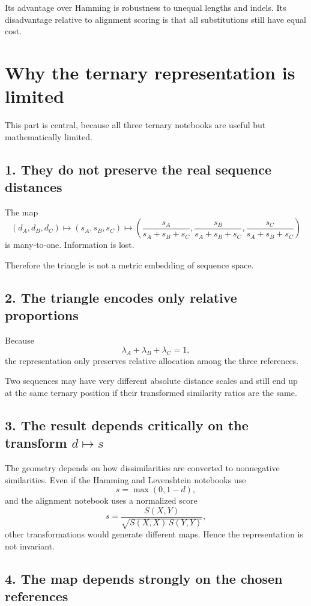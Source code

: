 \documentclass[11pt,a4paper]{article}
\begin{document}
Its advantage over Hamming is robustness to unequal lengths and indels. Its disadvantage relative to alignment scoring is that all substitutions still have equal cost.

\section{Why the ternary representation is limited}

This part is central, because all three ternary notebooks are useful but mathematically limited.

\subsection{1. They do not preserve the real sequence distances}

The map
\[
(d_A,d_B,d_C)\mapsto (s_A,s_B,s_C)\mapsto
\left(
\frac{s_A}{s_A+s_B+s_C},
\frac{s_B}{s_A+s_B+s_C},
\frac{s_C}{s_A+s_B+s_C}
\right)
\]
is many-to-one. Information is lost.

Therefore the triangle is not a metric embedding of sequence space.

\subsection{2. The triangle encodes only relative proportions}

Because
\[
\lambda_A+\lambda_B+\lambda_C=1,
\]
the representation only preserves relative allocation among the three references.

Two sequences may have very different absolute distance scales and still end up at the same ternary position if their transformed similarity ratios are the same.

\subsection{3. The result depends critically on the transform $d\mapsto s$}

The geometry depends on how dissimilarities are converted to nonnegative similarities. Even if the Hamming and Levenshtein notebooks use
\[
s=\max(0,1-d),
\]
and the alignment notebook uses a normalized score
\[
s=\frac{S(X,Y)}{\sqrt{S(X,X)\,S(Y,Y)}},
\]
other transformations would generate different maps. Hence the representation is not invariant.

\subsection{4. The map depends strongly on the chosen references}
\end{document}
